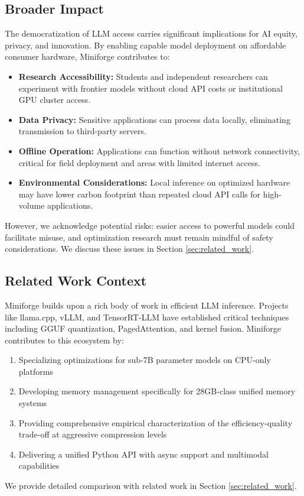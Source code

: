 \subsection{Broader Impact}

The democratization of LLM access carries significant implications for AI equity, privacy, and innovation. By enabling capable model deployment on affordable consumer hardware, Miniforge contributes to:

\begin{itemize}
    \item \textbf{Research Accessibility:} Students and independent researchers can experiment with frontier models without cloud API costs or institutional GPU cluster access.
    \item \textbf{Data Privacy:} Sensitive applications can process data locally, eliminating transmission to third-party servers.
    \item \textbf{Offline Operation:} Applications can function without network connectivity, critical for field deployment and areas with limited internet access.
    \item \textbf{Environmental Considerations:} Local inference on optimized hardware may have lower carbon footprint than repeated cloud API calls for high-volume applications.
\end{itemize}

However, we acknowledge potential risks: easier access to powerful models could facilitate misuse, and optimization research must remain mindful of safety considerations. We discuss these issues in Section \ref{sec:related_work}.

\subsection{Related Work Context}

Miniforge builds upon a rich body of work in efficient LLM inference. Projects like llama.cpp, vLLM, and TensorRT-LLM have established critical techniques including GGUF quantization, PagedAttention, and kernel fusion. Miniforge contributes to this ecosystem by:

\begin{enumerate}
    \item Specializing optimizations for sub-7B parameter models on CPU-only platforms
    \item Developing memory management specifically for 28GB-class unified memory systems
    \item Providing comprehensive empirical characterization of the efficiency-quality trade-off at aggressive compression levels
    \item Delivering a unified Python API with async support and multimodal capabilities
\end{enumerate}

We provide detailed comparison with related work in Section \ref{sec:related_work}.
